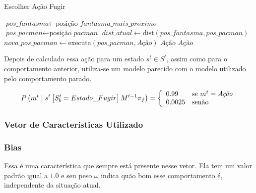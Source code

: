 \begin{algorithm}[h]
	\caption{Escolher Ação Fugir} \label{algorithm:SelecaoDeAcaoFugir}
	\begin{algorithmic}[1]
			\State $\textit{pos\_fantasma} \gets \text{posição }\textit{fantasma\_mais\_proximo} $
			\State $\textit{pos\_pacman} \gets \text{posição }\textit{pacman} $
			\State $\textit{dist\_atual} \gets \text{dist} \left( \textit{pos\_fantasma}, \textit{pos\_pacman} \right) $
				\State $\textit{nova\_pos\_pacman} \gets \text{executa} \left( \textit{pos\_pacman}, \textit{Ação} \right) $
					\State \Return $ \textit{Ação} $
				\EndIf 
			\EndFor
			\State \Return $ \textit{Ação} $
		\EndProcedure
	\end{algorithmic}
\end{algorithm}

Depois de calculado essa ação para um estado $ s^t \in S^t $, assim como para o comportamento anterior, utiliza-se um modelo parecido com o modelo utilizado pelo comportamento parado.

\begin{equation}
    P \left( m^t \mid s^t \left[ S_b^t = Estado\_Fugir \right] M^{t-1} \pi_f \right) = 
        \left\{
            \begin{array}{l l}
                0.99 & \text{se }m^t = \textit{Ação} \\
                0.0025 & \text{senão}
            \end{array}
        \right.
\end{equation}

\subsubsection{Vetor de Características Utilizado} \label{subsubsection:3ComportamentosVetorCaracterísticas}

\subsubsection*{Bias}

Essa é uma característica que sempre está presente nesse vetor. Ela tem um valor padrão igual a $ 1.0 $ e seu peso $ \omega $ indica quão bom esse comportamento é, independente da situação atual.

